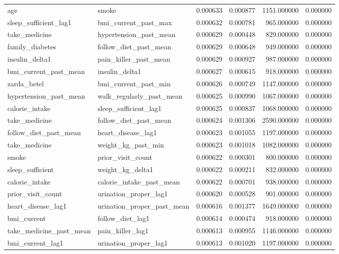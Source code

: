 \begin{longtable}{llrrrr}
age & smoke & 0.000633 & 0.000877 & 1151.000000 & 0.000000 \\
sleep\_sufficient\_lag1 & bmi\_current\_past\_max & 0.000632 & 0.000781 & 965.000000 & 0.000000 \\
take\_medicine & hypertension\_past\_mean & 0.000629 & 0.000448 & 829.000000 & 0.000000 \\
family\_diabetes & follow\_diet\_past\_mean & 0.000629 & 0.000648 & 949.000000 & 0.000000 \\
insulin\_delta1 & pain\_killer\_past\_mean & 0.000629 & 0.000927 & 987.000000 & 0.000000 \\
bmi\_current\_past\_mean & insulin\_delta1 & 0.000627 & 0.000615 & 918.000000 & 0.000000 \\
zarda\_betel & bmi\_current\_past\_min & 0.000626 & 0.000749 & 1147.000000 & 0.000000 \\
hypertension\_past\_mean & walk\_regularly\_past\_mean & 0.000625 & 0.000990 & 1067.000000 & 0.000000 \\
calorie\_intake & sleep\_sufficient\_lag1 & 0.000625 & 0.000837 & 1068.000000 & 0.000000 \\
take\_medicine & follow\_diet\_past\_mean & 0.000624 & 0.001306 & 2590.000000 & 0.000000 \\
follow\_diet\_past\_mean & heart\_disease\_lag1 & 0.000623 & 0.001055 & 1197.000000 & 0.000000 \\
take\_medicine & weight\_kg\_past\_min & 0.000623 & 0.001018 & 1082.000000 & 0.000000 \\
smoke & prior\_visit\_count & 0.000622 & 0.000301 & 800.000000 & 0.000000 \\
sleep\_sufficient & weight\_kg\_delta1 & 0.000622 & 0.000211 & 832.000000 & 0.000000 \\
calorie\_intake & calorie\_intake\_past\_mean & 0.000622 & 0.000701 & 938.000000 & 0.000000 \\
prior\_visit\_count & urination\_proper\_lag1 & 0.000620 & 0.000528 & 901.000000 & 0.000000 \\
heart\_disease\_lag1 & urination\_proper\_past\_mean & 0.000616 & 0.001377 & 1649.000000 & 0.000000 \\
bmi\_current & follow\_diet\_lag1 & 0.000614 & 0.000474 & 918.000000 & 0.000000 \\
take\_medicine\_past\_mean & pain\_killer\_lag1 & 0.000613 & 0.000955 & 1146.000000 & 0.000000 \\
bmi\_current\_lag1 & urination\_proper\_lag1 & 0.000613 & 0.001020 & 1197.000000 & 0.000000 \\

\end{longtable}

